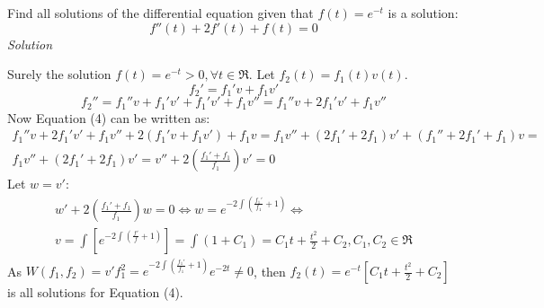 \begin{example}
Find all solutions of the differential equation given that $f(t) = e^{-t}$ is a
solution:
\begin{equation}
  f''(t) + 2 f'(t) + f(t) = 0
\end{equation}
\noindent\emph{Solution} 

Surely the solution $f(t) = e^{-t} > 0, \forall t \in \Re$. Let $f_2(t) = f_1(t) v(t)$.
\[
  f_2' = f_1' v + f_1 v'
\]
\[
  f_2'' = f_1'' v + f_1' v' + f_1' v' + f_1 v'' = f_1'' v + 2 f_1' v' + f_1 v''
\]
Now Equation (4) can be written as:
\begin{multline*}
  f_1'' v + 2 f_1'v' + f_1 v'' + 2 (f_1' v + f_1 v') + f_1 v = f_1 v'' + (2
  f_1' + 2 f_1 ) v' + (f_1'' + 2 f_1' + f_1) v = \\
  f_1 v'' + (2 f_1' + 2 f_1) v' = v'' + 2 \left(\frac{f_1' + f_1}{f_1}\right) v' = 0
\end{multline*}
Let $w = v'$:
\begin{multline*}
  w' + 2 \left(\frac{f_1' + f_1}{f_1}\right) w = 0 \Leftrightarrow w = e^{-2
  \int (\frac{f_1'}{f_1} + 1)} \Leftrightarrow \\ v = \int \left [ e^{-2 \int
  (\frac{f'}{f} + 1)} \right ] = \int (1 + C_1) = C_1 t + \frac{t^2}{2} + C_2,
  C_1, C_2 \in \Re
\end{multline*}
As $W(f_1, f_2) = v' f_1^2 = e^{-2 \int (\frac{f_1'}{f_1} + 1)} e^{-2t} \neq
0$, then $f_2(t) = e^{-t} \left [ C_1 t + \frac{t^2}{2} + C_2 \right ]$ is all
solutions for Equation (4).
\end{example}
